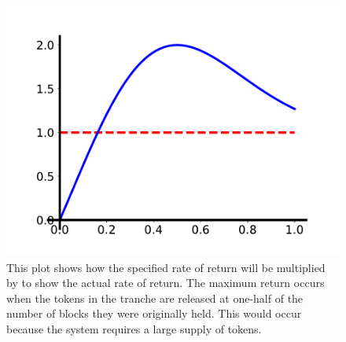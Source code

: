 \begin{figure}
    \centering
    \includegraphics[scale=0.5]{figures/ror_plot.pdf}
    \caption{This plot shows how the specified rate of return will be
        multiplied by to show the actual rate of return.
        The maximum return occurs when the tokens in the tranche are
        released at one-half of the number of blocks they were originally
        held.
        This would occur because the system requires a large supply
        of tokens.}
    \label{fig:rate_of_return}
\end{figure}

